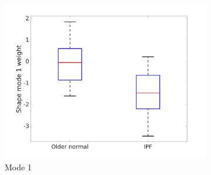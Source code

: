 \begin{figure}[htbp] 
\centering
\begin{subfigure}{.6\linewidth}%
  \includegraphics[width=\linewidth,trim={{.0\wd0} {.0\wd0} {.0\wd0} {.0\wd0}},clip]{QuantitativeAnalysis/Image/BoxPlot_Mode1.jpg} %
  \caption{Mode 1}
  \label{fig:ShapeDifference-a} 
\end{subfigure} 
\begin{subfigure}{.6\linewidth}%

\end{subfigure}
\end{figure}
